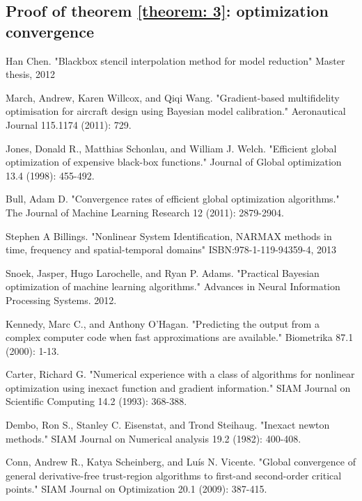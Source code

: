 \documentclass[a4paper,onecolumn]{article}
\theoremstyle{remark}
\begin{document}
\begin{appendices}
    \section{Proof of theorem \ref{theorem: 3}: optimization convergence}
\end{appendices}

\begin{thebibliography}{9}
Han Chen.
"Blackbox stencil interpolation method for model reduction"
Master thesis, 2012
 

March, Andrew, Karen Willcox, and Qiqi Wang. 
"Gradient-based multifidelity optimisation for aircraft design using Bayesian model calibration." 
Aeronautical Journal 115.1174 (2011): 729.

Jones, Donald R., Matthias Schonlau, and William J. Welch. 
"Efficient global optimization of expensive black-box functions." 
Journal of Global optimization 13.4 (1998): 455-492.

Bull, Adam D. 
"Convergence rates of efficient global optimization algorithms." 
The Journal of Machine Learning Research 12 (2011): 2879-2904.

Stephen A Billings.
"Nonlinear System Identification, NARMAX methods in time, frequency and spatial-temporal domains"
ISBN:978-1-119-94359-4, 2013

Snoek, Jasper, Hugo Larochelle, and Ryan P. Adams. 
"Practical Bayesian optimization of machine learning algorithms." 
Advances in Neural Information Processing Systems. 2012.

Kennedy, Marc C., and Anthony O'Hagan. 
"Predicting the output from a complex computer code when fast approximations are available." 
Biometrika 87.1 (2000): 1-13.

Carter, Richard G. 
"Numerical experience with a class of algorithms for nonlinear optimization using inexact function and gradient information." 
SIAM Journal on Scientific Computing 14.2 (1993): 368-388.

Dembo, Ron S., Stanley C. Eisenstat, and Trond Steihaug. 
"Inexact newton methods." 
SIAM Journal on Numerical analysis 19.2 (1982): 400-408.

Conn, Andrew R., Katya Scheinberg, and Luís N. Vicente. 
"Global convergence of general derivative-free trust-region algorithms to first-and second-order critical points." 
SIAM Journal on Optimization 20.1 (2009): 387-415.


\end{thebibliography}
\end{document}
